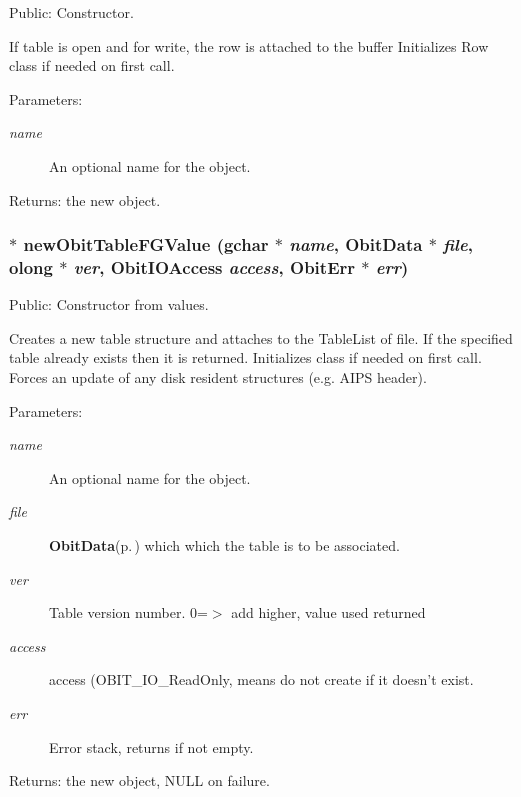 Public: Constructor. 

If table is open and for write, the row is attached to the buffer Initializes Row class if needed on first call. \begin{Desc}
\item[Parameters:]
\begin{description}
\item[{\em name}]An optional name for the object. \end{description}
\end{Desc}
\begin{Desc}
\item[Returns:]the new object. \end{Desc}
\subsubsection{$\ast$ new\-Obit\-Table\-FGValue (gchar $\ast$ {\em name}, {\bf Obit\-Data} $\ast$ {\em file}, {\bf olong} $\ast$ {\em ver}, Obit\-IOAccess {\em access}, {\bf Obit\-Err} $\ast$ {\em err})}\label{ObitTableFG_8h_a12}


Public: Constructor from values. 

Creates a new table structure and attaches to the Table\-List of file. If the specified table already exists then it is returned. Initializes class if needed on first call. Forces an update of any disk resident structures (e.g. AIPS header). \begin{Desc}
\item[Parameters:]
\begin{description}
\item[{\em name}]An optional name for the object. \item[{\em file}]{\bf Obit\-Data}{\rm (p.\,\pageref{structObitData})} which which the table is to be associated. \item[{\em ver}]Table version number. 0=$>$ add higher, value used returned \item[{\em access}]access (OBIT\_\-IO\_\-Read\-Only, means do not create if it doesn't exist. \item[{\em err}]Error stack, returns if not empty. \end{description}
\end{Desc}
\begin{Desc}
\item[Returns:]the new object, NULL on failure. \end{Desc}
